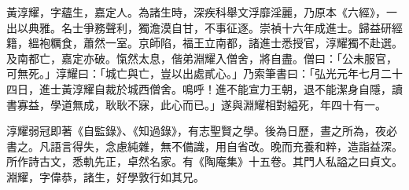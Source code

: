 \begin{pinyinscope}
黃淳耀，字蘊生，嘉定人。為諸生時，深疾科舉文浮靡淫麗，乃原本《六經》，一出以典雅。名士爭務聲利，獨澹漠自甘，不事征逐。崇禎十六年成進士。歸益研經籍，縕袍糲食，蕭然一室。京師陷，福王立南都，諸進士悉授官，淳耀獨不赴選。及南都亡，嘉定亦破。愾然太息，偕弟淵耀入僧舍，將自盡。僧曰：「公未服官，可無死。」淳耀曰：「城亡與亡，豈以出處貳心。」乃索筆書曰：「弘光元年七月二十四日，進士黃淳耀自裁於城西僧舍。鳴呼！進不能宣力王朝，退不能潔身自隱，讀書寡益，學道無成，耿耿不寐，此心而已。」遂與淵耀相對縊死，年四十有一。

淳耀弱冠即著《自監錄》、《知過錄》，有志聖賢之學。後為日歷，晝之所為，夜必書之。凡語言得失，念慮純雜，無不備識，用自省改。晚而充養和粹，造詣益深。所作詩古文，悉軌先正，卓然名家。有《陶庵集》十五卷。其門人私謚之曰貞文。淵耀，字偉恭，諸生，好學敦行如其兄。


\end{pinyinscope}